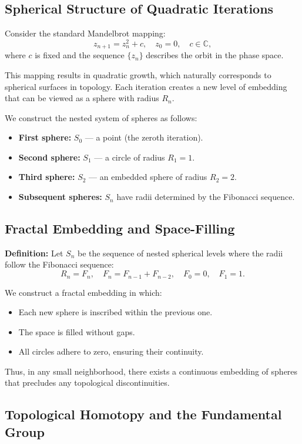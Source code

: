 \documentclass[12pt]{article}
\begin{document}
\subsection{Spherical Structure of Quadratic Iterations}

Consider the standard Mandelbrot mapping:
\[
z_{n+1} = z_n^2 + c, \quad z_0 = 0, \quad c \in \mathbb{C},
\]
where \(c\) is fixed and the sequence \(\{z_n\}\) describes the orbit in the phase space.

This mapping results in quadratic growth, which naturally corresponds to spherical surfaces in topology. Each iteration creates a new level of embedding that can be viewed as a sphere with radius \(R_n\).

We construct the nested system of spheres as follows:
\begin{itemize}
\item \textbf{First sphere:} \(S_0\) --- a point (the zeroth iteration).
\item \textbf{Second sphere:} \(S_1\) --- a circle of radius \(R_1 = 1\).
\item \textbf{Third sphere:} \(S_2\) --- an embedded sphere of radius \(R_2 = 2\).
\item \textbf{Subsequent spheres:} \(S_n\) have radii determined by the Fibonacci sequence.
\end{itemize}

\subsection{Fractal Embedding and Space-Filling}

\textbf{Definition:} Let \(S_n\) be the sequence of nested spherical levels where the radii follow the Fibonacci sequence:
\[
R_n = F_n, \quad F_n = F_{n-1} + F_{n-2}, \quad F_0 = 0, \quad F_1 = 1.
\]

We construct a fractal embedding in which:
\begin{itemize}
\item Each new sphere is inscribed within the previous one.
\item The space is filled without gaps.
\item All circles adhere to zero, ensuring their continuity.
\end{itemize}

Thus, in any small neighborhood, there exists a continuous embedding of spheres that precludes any topological discontinuities.

\subsection{Topological Homotopy and the Fundamental Group}
\end{document}
